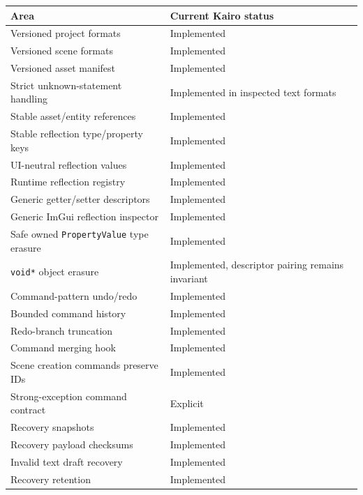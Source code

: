 {\def\LTcaptype{none} %
\begin{longtable}[]{@{}
  >{\raggedright\arraybackslash}p{}
  >{\raggedright\arraybackslash}p{}@{}}
\toprule\noalign{}
\begin{minipage}[b]{\linewidth}\raggedright
Area
\end{minipage} & \begin{minipage}[b]{\linewidth}\raggedright
Current Kairo status
\end{minipage} \\
\midrule\noalign{}
\endhead
\bottomrule\noalign{}
\endlastfoot
Versioned project formats & Implemented \\
Versioned scene formats & Implemented \\
Versioned asset manifest & Implemented \\
Strict unknown-statement handling & Implemented in inspected text formats \\
Stable asset/entity references & Implemented \\
Stable reflection type/property keys & Implemented \\
UI-neutral reflection values & Implemented \\
Runtime reflection registry & Implemented \\
Generic getter/setter descriptors & Implemented \\
Generic ImGui reflection inspector & Implemented \\
Safe owned \texttt{PropertyValue} type erasure & Implemented \\
\texttt{void*} object erasure & Implemented, descriptor pairing remains invariant \\
Command-pattern undo/redo & Implemented \\
Bounded command history & Implemented \\
Redo-branch truncation & Implemented \\
Command merging hook & Implemented \\
Scene creation commands preserve IDs & Implemented \\
Strong-exception command contract & Explicit \\
Recovery snapshots & Implemented \\
Recovery payload checksums & Implemented \\
Invalid text draft recovery & Implemented \\
Recovery retention & Implemented \\

\end{longtable}}
